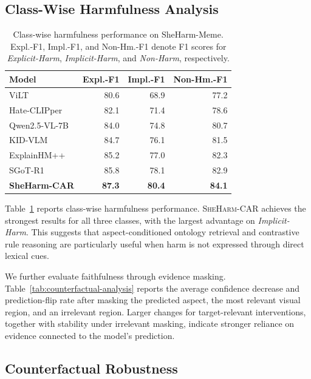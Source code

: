 \documentclass[11pt]{article}
\begin{document}
\subsection{Class-Wise Harmfulness Analysis}
\begin{table}[t]
\centering
\small
\setlength{\tabcolsep}{3pt}
\renewcommand{\arraystretch}{1.04}
\begin{tabular}{lrrr}
\toprule
\textbf{Model} &
\textbf{Expl.-F1} &
\textbf{Impl.-F1} &
\textbf{Non-Hm.-F1} \\
\midrule
ViLT 
& 80.6 & 68.9 & 77.2 \\

Hate-CLIPper 
& 82.1 & 71.4 & 78.6 \\

Qwen2.5-VL-7B 
& 84.0 & 74.8 & 80.7 \\

KID-VLM 
& 84.7 & 76.1 & 81.5 \\

ExplainHM++ 
& 85.2 & 77.0 & 82.3 \\

SGoT-R1 
& 85.8 & 78.1 & 82.9 \\

\midrule
\textbf{SheHarm-CAR}
& \textbf{87.3}
& \textbf{80.4}
& \textbf{84.1} \\
\bottomrule
\end{tabular}
\caption{Class-wise harmfulness performance on SheHarm-Meme.
Expl.-F1, Impl.-F1, and Non-Hm.-F1 denote F1 scores for
\textit{Explicit-Harm}, \textit{Implicit-Harm}, and
\textit{Non-Harm}, respectively.}
\label{tab:classwise-harm}
\end{table}
Table~\ref{tab:classwise-harm} reports class-wise harmfulness
performance. \textsc{SheHarm-CAR} achieves the strongest results for
all three classes, with the largest advantage on
\textit{Implicit-Harm}. This suggests that aspect-conditioned ontology
retrieval and contrastive rule reasoning are particularly useful when
harm is not expressed through direct lexical cues.

We further evaluate faithfulness through evidence masking.
Table~\ref{tab:counterfactual-analysis} reports the average
confidence decrease and prediction-flip rate after masking the
predicted aspect, the most relevant visual region, and an irrelevant
region. Larger changes for target-relevant interventions, together
with stability under irrelevant masking, indicate stronger reliance
on evidence connected to the model's prediction.
\subsection{Counterfactual Robustness}
\label{subsec:counterfactual-analysis}
\end{document}
